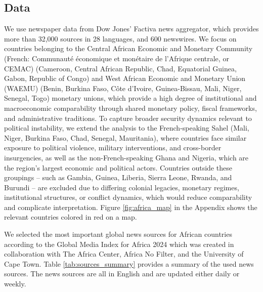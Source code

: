 \documentclass[12pt,a4paper,fleqn]{article}
\begin{document}
\subsection{Data}\label{sec:data}

We use newspaper data from Dow Jones' Factiva news aggregator, which provides more than 32,000 sources in 28 languages, and 600 newswires. We focus on countries belonging to the Central African Economic and Monetary Community (French: Communauté économique et monétaire de l'Afrique centrale, or CEMAC) (Cameroon, Central African Republic, Chad, Equatorial Guinea, Gabon, Republic of Congo) and West African Economic and Monetary Union (WAEMU) (Benin, Burkina Faso, Côte d'Ivoire, Guinea-Bissau, Mali, Niger, Senegal, Togo) monetary unions, which provide a high degree of institutional and macroeconomic comparability through shared monetary policy, fiscal frameworks, and administrative traditions. To capture broader security dynamics relevant to political instability, we extend the analysis to the French-speaking Sahel (Mali, Niger, Burkina Faso, Chad, Senegal, Mauritania), where countries face similar exposure to political violence, military interventions, and cross-border insurgencies, as well as the non-French-speaking Ghana and Nigeria, which are the region’s largest economic and political actors. Countries outside these groupings -- such as Gambia, Guinea, Liberia, Sierra Leone, Rwanda, and Burundi -- are excluded due to differing colonial legacies, monetary regimes, institutional structures, or conflict dynamics, which would reduce comparability and complicate interpretation. Figure \ref{fig:africa_map} in the Appendix shows the relevant countries colored in red on a map. 



We selected the most important global news sources for African countries according to the Global Media Index for Africa 2024 which was created in collaboration with The Africa Center, Africa No Filter, and the University of Cape Town. Table \ref{tab:sources_summary} provides a summary of the used news sources. The news sources are all in English and are updated either daily or weekly.
\end{document}
